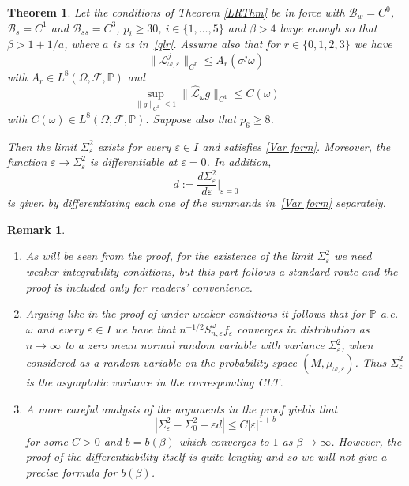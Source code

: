 \documentclass[11pt,reqno,a4paper]{article}
\newtheorem{maintheorem}{Theorem}
\theoremstyle{special}
\newtheorem{remark}[theorem]{Remark}
\def\B{\mathcal{B}}
\def\om{\omega}
\begin{document}
\begin{maintheorem}\label{DiffThm}
Let the conditions of Theorem \ref{LRThm} be in force with $\B_w=C^0$, $\B_s=C^1$ and $\B_{ss}=C^3$, $p_i\geq 30$, $i \in \{1, \ldots, 5\}$ and  $\beta>4$  large enough so that $\beta>1+1/a$, where $a$ is as in~\eqref{qlr}. Assume also  that for $r\in \{0, 1,2,3\}$ we have
\begin{equation}\label{TOB}
\|\mathcal L_{\om, \varepsilon}^j\|_{C^r}\leq A_r(\sigma^j\om)
\end{equation}
with $A_r\in L^{8}(\Omega,\mathcal F,\mathbb P)$  and
\begin{equation}\label{C om}
 \sup_{\|g\|_{C^2}\leq 1}\|\hat{\mathcal L}_\om g\|_{C^1}\leq C(\om)   
\end{equation}
with  $C(\om)\in L^{8}(\Omega,\mathcal F,\mathbb P)$. Suppose also that  $p_6\geq 8$.

Then the limit $\Sigma_\varepsilon^2$ exists for every $\varepsilon\in I$ and satisfies \eqref{Var form}. Moreover, the
function $\varepsilon\to \Sigma_\varepsilon^2$ is differentiable at $\varepsilon=0$. In addition, 
$$
d:=\frac{d\Sigma_{\varepsilon}^2}{d\varepsilon}\Big|_{\varepsilon=0}
$$
is given by differentiating each one of the summands in~\eqref{Var form} separately. 
\end{maintheorem}

\begin{remark}
\begin{enumerate}
\item[(i)] As will be seen from the proof, for the existence of  the limit $\Sigma_\varepsilon^2$ we need weaker integrability conditions, but this part follows a standard route and the proof is included only for readers' convenience. 

\item[(ii)] Arguing like in the proof of \cite[Theorem 2.11]{YH 23} under weaker conditions it follows that for $\mathbb P$-a.e. $\om$ and  every $\varepsilon\in I$ we have that $n^{-1/2}S_{n,\varepsilon}^\om f_\varepsilon$ converges in distribution as $n\to\infty$ to a zero mean normal random variable with variance $\Sigma^2_{\varepsilon}$, when considered as a random variable on the probability space $(M, \mu_{\om,\varepsilon})$. Thus $\Sigma^2_\varepsilon$ is the asymptotic variance in the corresponding CLT. 

\item[(iii)] A more careful analysis of the arguments in the proof yields that 
$$
\left|\Sigma_\varepsilon^2-\Sigma_0^2-\varepsilon d\right|\leq C|\varepsilon|^{1+b}
$$
for some $C>0$ and  $b=b(\beta)$ which converges to $1$ as $\beta\to\infty$. However, the proof of the differentiability itself is quite lengthy and so we will not give a precise formula for $b(\beta)$.
\end{enumerate}
\end{remark}
\end{document}
